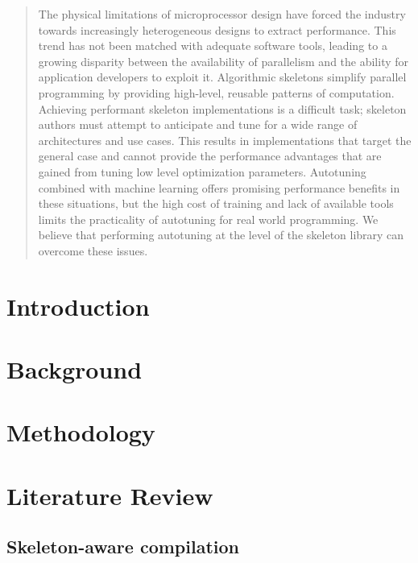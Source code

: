 \begin{abstract}
  The physical limitations of microprocessor design have forced the
  industry towards increasingly heterogeneous designs to extract
  performance. This trend has not been matched with adequate software
  tools, leading to a growing disparity between the availability of
  parallelism and the ability for application developers to exploit
  it. Algorithmic skeletons simplify parallel programming by providing
  high-level, reusable patterns of computation. Achieving performant
  skeleton implementations is a difficult task; skeleton authors must
  attempt to anticipate and tune for a wide range of architectures and
  use cases. This results in implementations that target the general
  case and cannot provide the performance advantages that are gained
  from tuning low level optimization parameters. Autotuning combined
  with machine learning offers promising performance benefits in these
  situations, but the high cost of training and lack of available
  tools limits the practicality of autotuning for real world
  programming. We believe that performing autotuning at the level of
  the skeleton library can overcome these issues.
\end{abstract}


\section{Introduction}


\section{Background}


\section{Methodology}


\section{Literature Review}


\subsection{Skeleton-aware compilation}



